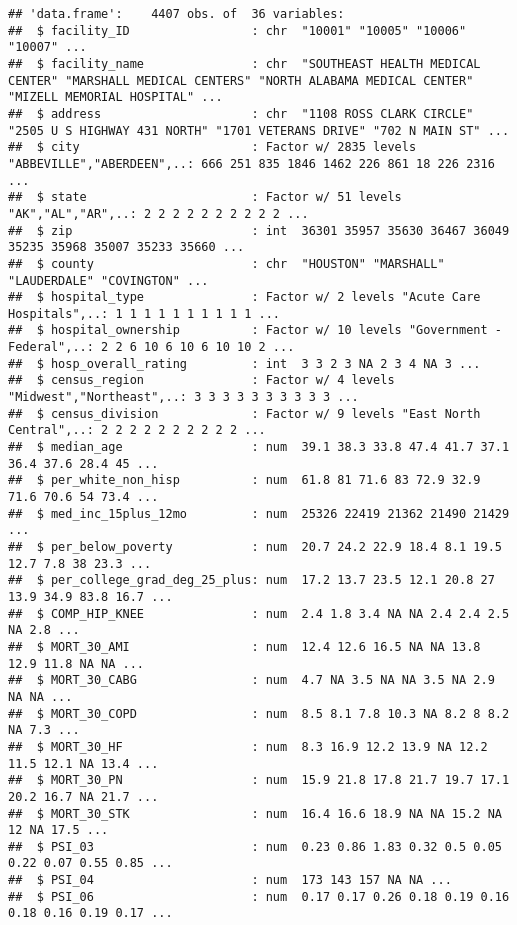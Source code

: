 \documentclass[
]{article}
\begin{document}
\begin{verbatim}
## 'data.frame':    4407 obs. of  36 variables:
##  $ facility_ID                 : chr  "10001" "10005" "10006" "10007" ...
##  $ facility_name               : chr  "SOUTHEAST HEALTH MEDICAL CENTER" "MARSHALL MEDICAL CENTERS" "NORTH ALABAMA MEDICAL CENTER" "MIZELL MEMORIAL HOSPITAL" ...
##  $ address                     : chr  "1108 ROSS CLARK CIRCLE" "2505 U S HIGHWAY 431 NORTH" "1701 VETERANS DRIVE" "702 N MAIN ST" ...
##  $ city                        : Factor w/ 2835 levels "ABBEVILLE","ABERDEEN",..: 666 251 835 1846 1462 226 861 18 226 2316 ...
##  $ state                       : Factor w/ 51 levels "AK","AL","AR",..: 2 2 2 2 2 2 2 2 2 2 ...
##  $ zip                         : int  36301 35957 35630 36467 36049 35235 35968 35007 35233 35660 ...
##  $ county                      : chr  "HOUSTON" "MARSHALL" "LAUDERDALE" "COVINGTON" ...
##  $ hospital_type               : Factor w/ 2 levels "Acute Care Hospitals",..: 1 1 1 1 1 1 1 1 1 1 ...
##  $ hospital_ownership          : Factor w/ 10 levels "Government - Federal",..: 2 2 6 10 6 10 6 10 10 2 ...
##  $ hosp_overall_rating         : int  3 3 2 3 NA 2 3 4 NA 3 ...
##  $ census_region               : Factor w/ 4 levels "Midwest","Northeast",..: 3 3 3 3 3 3 3 3 3 3 ...
##  $ census_division             : Factor w/ 9 levels "East North Central",..: 2 2 2 2 2 2 2 2 2 2 ...
##  $ median_age                  : num  39.1 38.3 33.8 47.4 41.7 37.1 36.4 37.6 28.4 45 ...
##  $ per_white_non_hisp          : num  61.8 81 71.6 83 72.9 32.9 71.6 70.6 54 73.4 ...
##  $ med_inc_15plus_12mo         : num  25326 22419 21362 21490 21429 ...
##  $ per_below_poverty           : num  20.7 24.2 22.9 18.4 8.1 19.5 12.7 7.8 38 23.3 ...
##  $ per_college_grad_deg_25_plus: num  17.2 13.7 23.5 12.1 20.8 27 13.9 34.9 83.8 16.7 ...
##  $ COMP_HIP_KNEE               : num  2.4 1.8 3.4 NA NA 2.4 2.4 2.5 NA 2.8 ...
##  $ MORT_30_AMI                 : num  12.4 12.6 16.5 NA NA 13.8 12.9 11.8 NA NA ...
##  $ MORT_30_CABG                : num  4.7 NA 3.5 NA NA 3.5 NA 2.9 NA NA ...
##  $ MORT_30_COPD                : num  8.5 8.1 7.8 10.3 NA 8.2 8 8.2 NA 7.3 ...
##  $ MORT_30_HF                  : num  8.3 16.9 12.2 13.9 NA 12.2 11.5 12.1 NA 13.4 ...
##  $ MORT_30_PN                  : num  15.9 21.8 17.8 21.7 19.7 17.1 20.2 16.7 NA 21.7 ...
##  $ MORT_30_STK                 : num  16.4 16.6 18.9 NA NA 15.2 NA 12 NA 17.5 ...
##  $ PSI_03                      : num  0.23 0.86 1.83 0.32 0.5 0.05 0.22 0.07 0.55 0.85 ...
##  $ PSI_04                      : num  173 143 157 NA NA ...
##  $ PSI_06                      : num  0.17 0.17 0.26 0.18 0.19 0.16 0.18 0.16 0.19 0.17 ...

\end{verbatim}
\end{document}
